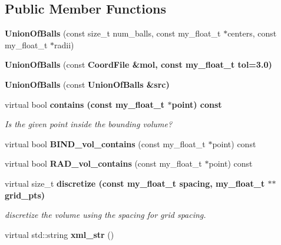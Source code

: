 \subsection*{Public Member Functions}
\begin{CompactItemize}
\item 
\textbf{Union\-Of\-Balls} (const size\_\-t num\_\-balls, const my\_\-float\_\-t $\ast$centers, const my\_\-float\_\-t $\ast$radii)\label{classSimSite3D_1_1UnionOfBalls_bdf71b8d8aa0c447e35e7b61b577f56c}

\item 
\textbf{Union\-Of\-Balls} (const \bf{Coord\-File} \&mol, const my\_\-float\_\-t tol=3.0)\label{classSimSite3D_1_1UnionOfBalls_93603c0f91e9a901bcf55ed17183f974}

\item 
\textbf{Union\-Of\-Balls} (const \bf{Union\-Of\-Balls} \&src)\label{classSimSite3D_1_1UnionOfBalls_525cc26074e6e938ee3f8e0a00580df5}

\item 
virtual bool \bf{contains} (const my\_\-float\_\-t $\ast$point) const \label{classSimSite3D_1_1UnionOfBalls_35d7a6372c343fd49af508223540dbfe}

\begin{CompactList}\small\item\em Is the given point inside the bounding volume? \item\end{CompactList}\item 
virtual bool \textbf{BIND\_\-vol\_\-contains} (const my\_\-float\_\-t $\ast$point) const \label{classSimSite3D_1_1UnionOfBalls_062e19950a34f2c92756ddd474d17db4}

\item 
virtual bool \textbf{RAD\_\-vol\_\-contains} (const my\_\-float\_\-t $\ast$point) const \label{classSimSite3D_1_1UnionOfBalls_85d46140c2f090aecb2e9b2970bc71c1}

\item 
virtual size\_\-t \bf{discretize} (const my\_\-float\_\-t spacing, my\_\-float\_\-t $\ast$$\ast$grid\_\-pts)\label{classSimSite3D_1_1UnionOfBalls_5f3ca248e1e5e8554dae45ac5c426c28}

\begin{CompactList}\small\item\em discretize the volume using the spacing for grid spacing. \item\end{CompactList}\item 
virtual std::string \textbf{xml\_\-str} ()\label{classSimSite3D_1_1UnionOfBalls_84e656c9ff4fef4f7a4707495715ff70}

\end{CompactItemize}
